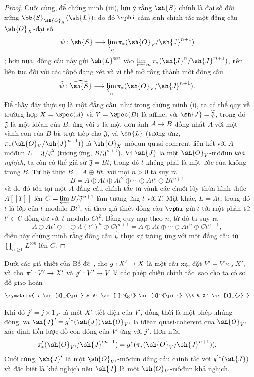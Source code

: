 \documentclass[oneside,10pt]{amsart}
\makeatletter
\renewcommand{\geq}{\geqslant}
\newcommand{\ega@arrow}[2]{\mathchoice{#1}{#2}{#2}{#2}}
\renewcommand{\to}{\ega@arrow{\longrightarrow}{\rightarrow}}
\newcommand{\oldpage}[2][]{\marginnote{\normalfont\footnotesize\textbf{#1}~|~#2}\ignorespaces}
\let\EGAOriginalLabel\label
\renewcommand{\label}[1]{\phantomsection\EGAOriginalLabel{#1}}
\makeatother
\begin{document}
\begin{proof}
Cuối cùng, để chứng minh (iii), lưu ý rằng $\sh{S}$ chính là đại số đối xứng $\bb{S}_{\sh{O}_X}(\sh{L})$;
do đó $\vphi$ cảm sinh chính tắc một đồng cấu $\sh{O}_X$-đại số
\[
  \psi:\sh{S}\longrightarrow
  \varprojlim_n\pi_*(\sh{O}_V/\sh{J}^{n+1})
\]
;
hơn nữa, đồng cấu này gửi $\sh{L}^{\otimes n}$ vào $\varprojlim_m\pi_*(\sh{J}^n/\sh{J}^{m+1})$, nên liên tục đối với các tôpô đang xét và vì thế mở rộng thành một đồng cấu
\[
  \widehat{\psi}:\widehat{\sh{S}}\longrightarrow
  \varprojlim_n\pi_*(\sh{O}_V/\sh{J}^{n+1}).
\]
Để thấy đây thực sự là một đẳng cấu, như trong chứng minh (i), ta có thể quy về trường hợp $X=\Spec(A)$ và $V=\Spec(B)$ là affine, với $\sh{J}=\widetilde{\mathfrak{J}}$, trong đó $\mathfrak{J}$ là một iđêan của $B$;
ứng với $\pi$ là một đơn ánh $A\to B$ đồng nhất $A$ với một vành con của $B$ bù trực tiếp cho $\mathfrak{J}$, và $\sh{L}$ (tương ứng, $\pi_*(\sh{O}_V/\sh{J}^{n+1})$) là $\sh{O}_X$-môđun quasi-coherent liên kết với $A$-môđun $L=\mathfrak{J}/\mathfrak{J}^2$ (tương ứng, $B/\mathfrak{J}^{n+1}$).
Vì $\sh{J}$ là một $\sh{O}_V$-môđun \emph{khả nghịch}, ta còn có thể giả sử $\mathfrak{J}=Bt$, trong đó $t$ không phải là một ước của không trong $B$.
Từ hệ thức $B=A\oplus Bt$, với mọi $n>0$ ta suy ra
\[
  B=A\oplus At\oplus At^2\oplus\cdots\oplus At^n\oplus Bt^{n+1}
\]
và do đó tồn tại một $A$-đẳng cấu chính tắc từ vành các chuỗi lũy thừa hình thức $A[[T]]$ lên $C=\varprojlim B/\mathfrak{J}^{n+1}$ làm tương ứng $t$ với $T$.
Mặt khác, $L=A\overline{t}$, trong đó $\overline{t}$ là lớp của $t$ modulo $Bt^2$, và theo giả thiết đồng cấu $\vphi$ gửi $\overline{t}$ tới một phần tử $t'\in C$ đồng dư với $t$ modulo $Ct^2$.
Bằng quy nạp theo $n$, từ đó ta suy ra
\[
  A\oplus At'\oplus\cdots\oplus A(t')^n\oplus Ct^{n+1}
  =A\oplus At\oplus\cdots\oplus At^n\oplus Ct^{n+1},
\]
điều này chứng minh rằng đồng cấu $\widehat{\psi}$ thực sự tương ứng với một đẳng cấu từ $\prod_{n\geq0}L^{\otimes n}$ lên $C$.
\end{proof}

\begin{lemma}[8.10.2]
\label{II.8.10.2}
Dưới các giả thiết của Bổ đề~, cho $g:X'\to X$ là một cấu xạ,
\oldpage[II]{186}
đặt $V'=V\times_X X'$, và cho $\pi':V'\to X'$ và $g':V'\to V$ là các phép chiếu chính tắc, sao cho ta có sơ đồ giao hoán
\[
  \xymatrix{
    V
      \ar[d]_{\pi}
  & V'
      \ar[l]^{g'}
      \ar[d]^{\pi'}
  \\X
  & X'
      \ar[l]_{g}
  }
\]

Khi đó $j'=j\times1_{X'}$ là một $X'$-tiết diện của $V'$, đồng thời là một phép nhúng đóng, và $\sh{J}'=g^{'*}(\sh{J})\sh{O}_{V'}$ là iđêan quasi-coherent của $\sh{O}_{V'}$ xác định tiền lược đồ con đóng của $V'$ ứng với $j'$.
Hơn nữa,
\[
  \pi'_*(\sh{O}_{V'}/\sh{J}'^{\,n+1})
  =g^*(\pi_*(\sh{O}_V/\sh{J}^{n+1})).
\]
Cuối cùng, $\sh{J}'$ là một $\sh{O}_{V'}$-môđun đẳng cấu chính tắc với $g^{'*}(\sh{J})$ và đặc biệt là khả nghịch nếu $\sh{J}$ là một $\sh{O}_V$-môđun khả nghịch.
\end{lemma}
\end{document}
